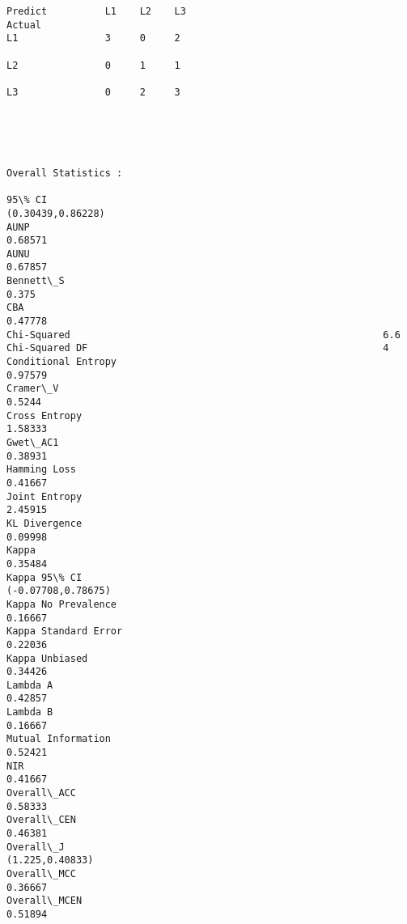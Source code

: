 \documentclass[11pt]{article}
\begin{document}
    \begin{Verbatim}[commandchars=\\\{\}]
Predict          L1    L2    L3    
Actual
L1               3     0     2     

L2               0     1     1     

L3               0     2     3     





Overall Statistics : 

95\% CI                                                           (0.30439,0.86228)
AUNP                                                             0.68571
AUNU                                                             0.67857
Bennett\_S                                                        0.375
CBA                                                              0.47778
Chi-Squared                                                      6.6
Chi-Squared DF                                                   4
Conditional Entropy                                              0.97579
Cramer\_V                                                         0.5244
Cross Entropy                                                    1.58333
Gwet\_AC1                                                         0.38931
Hamming Loss                                                     0.41667
Joint Entropy                                                    2.45915
KL Divergence                                                    0.09998
Kappa                                                            0.35484
Kappa 95\% CI                                                     (-0.07708,0.78675)
Kappa No Prevalence                                              0.16667
Kappa Standard Error                                             0.22036
Kappa Unbiased                                                   0.34426
Lambda A                                                         0.42857
Lambda B                                                         0.16667
Mutual Information                                               0.52421
NIR                                                              0.41667
Overall\_ACC                                                      0.58333
Overall\_CEN                                                      0.46381
Overall\_J                                                        (1.225,0.40833)
Overall\_MCC                                                      0.36667
Overall\_MCEN                                                     0.51894

\end{Verbatim}
\end{document}
